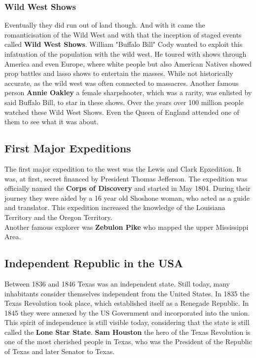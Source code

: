 \documentclass{article}
\begin{document}
	\subsubsection{Wild West Shows}
	Eventually they did run out of land though. And with it came the romanticisation of the Wild West and with that the inception of staged events called \textbf{Wild West Shows}. William "Buffalo Bill" Cody wanted to exploit this infatuation of the population with the wild west. He toured with shows through America and even Europe, where white people but also American Natives showed prop battles and lasso shows to entertain the masses. While not historically accurate, as the wild west was often connected to massacres. Another famous person \textbf{Annie Oakley} a female sharpshooter, which was a rarity, was enlisted by said Buffalo Bill, to star in these shows. Over the years over 100 million people watched these Wild West Shows. Even the Queen of England attended one of them to see what it was about. \\
	\subsection{First Major Expeditions}
	The first major expedition to the west was the Lewis and Clark Epxedition. It was, at first, secret financed by President Thomas Jefferson. The expedition was officially named the \textbf{Corps of Discovery} and started in May 1804. During their journey they were aided by a 16 year old Shoshone woman, who acted as a guide and translator. This expedition increased the knowledge of the Louisiana Territory and the Oregon Territory. \\
	Another famous explorer was \textbf{Zebulon Pike} who mapped the upper Mississippi Area. \\
	\subsection{Independent Republic in the USA}
	Between 1836 and 1846 Texas was an independent state. Still today, many inhabitants consider themselves independent from the United States. In 1835 the Texas Revolution took place, which established itself as a Renegade Republic. In 1845 they were annexed by the US Government and incorporated into the union. This spirit of independence is still visible today, considering that the state is still called the \textbf{Lone Star State}. \textbf{Sam Houston} the hero of the Texas Revolution is one of the most cherished people in Texas, who was the President of the Republic of Texas and later Senator to Texas. \\
\end{document}

